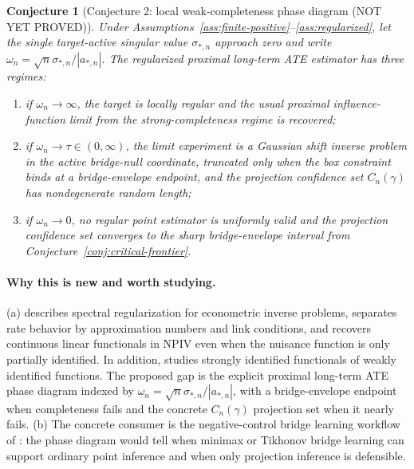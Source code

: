 \documentclass[11pt]{article}
\theoremstyle{definition}
\theoremstyle{plain}
\newtheorem{conjecture}{Conjecture}
\theoremstyle{remark}
\begin{document}
\begin{conjecture}[Conjecture 2: local weak-completeness phase diagram (NOT YET PROVED)]\label{conj:local-weak}
Under Assumptions~\ref{ass:finite-positive}--\ref{ass:regularized}, let the
single target-active singular value \(\sigma_{*,n}\) approach zero and write
\(\omega_n=\sqrt{n}\sigma_{*,n}/|a_{*,n}|\).  The regularized proximal
long-term ATE estimator has three regimes:
\begin{enumerate}[label=(\roman*)]
\item if \(\omega_n\to\infty\), the target is locally regular and the usual
proximal influence-function limit from the strong-completeness regime is
recovered;
\item if \(\omega_n\to\tau\in(0,\infty)\), the limit experiment is a Gaussian
shift inverse problem in the active bridge-null coordinate, truncated only when
the box constraint binds at a bridge-envelope endpoint, and the projection
confidence set \(C_n(\gamma)\) has nondegenerate random length;
\item if \(\omega_n\to0\), no regular point estimator is uniformly valid and
the projection confidence set converges to the sharp bridge-envelope interval
from Conjecture~\ref{conj:critical-frontier}.
\end{enumerate}
\end{conjecture}

\paragraph{Why this is new and worth studying.}
(a) \citet[Chapter 77, Sections 1 and 3]{CarrascoFlorensRenault2007} describes
spectral regularization for econometric inverse problems,
\citet[Sections 2--3]{ChenReiss2011} separates rate behavior by approximation
numbers and link conditions, and
\citet[Abstract and Sections 2--3]{Santos2011JoE} recovers continuous linear
functionals in NPIV even when the nuisance function is only partially
identified.  In addition,
\citet[Abstract, Theorem 2.1, and Section 4]{BennettKallusMaoNeweySyrgkanisUehara2023}
studies strongly identified functionals of weakly identified functions.  The
proposed gap is the explicit proximal long-term ATE phase diagram indexed by
\(\omega_n=\sqrt{n}\sigma_{*,n}/|a_{*,n}|\), with a bridge-envelope endpoint
when completeness fails and the concrete \(C_n(\gamma)\) projection set when it
nearly fails.  (b) The concrete consumer is the negative-control bridge learning
workflow of \citet[Abstract and Section 4]{KallusMaoUehara2021}: the phase
diagram would tell when minimax or Tikhonov bridge learning can support ordinary
point inference and when only projection inference is defensible.
\end{document}
